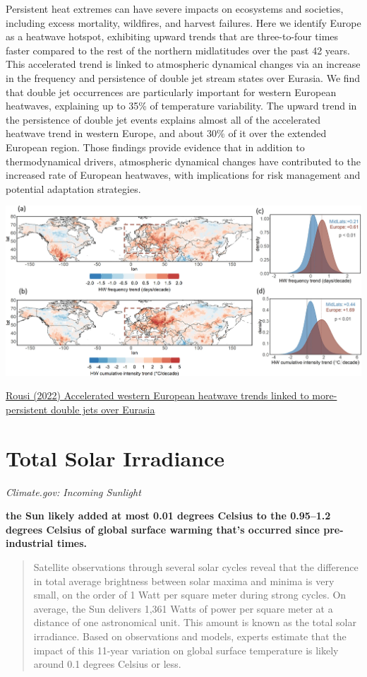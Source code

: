 \documentclass[
]{book}
\begin{document}
Persistent heat extremes can have severe impacts on ecosystems and societies, including excess mortality, wildfires, and harvest failures. Here we identify Europe as a heatwave hotspot, exhibiting upward trends that are three-to-four times faster compared to the rest of the northern midlatitudes over the past 42 years. This accelerated trend is linked to atmospheric dynamical changes via an increase in the frequency and persistence of double jet stream states over Eurasia. We find that double jet occurrences are particularly important for western European heatwaves, explaining up to 35\% of temperature variability. The upward trend in the persistence of double jet events explains almost all of the accelerated heatwave trend in western Europe, and about 30\% of it over the extended European region. Those findings provide evidence that in addition to thermodynamical drivers, atmospheric dynamical changes have contributed to the increased rate of European heatwaves, with implications for risk management and potential adaptation strategies.

\includegraphics{fig/heatwave_europe.png}

\href{https://www.nature.com/articles/s41467-022-31432-y}{Rousi (2022) Accelerated western European heatwave trends linked to more-persistent double jets over Eurasia}

\hypertarget{total-solar-irradiance}{%
\section{Total Solar Irradiance}\label{total-solar-irradiance}}

\emph{Climate.gov: Incoming Sunlight}

\textbf{the Sun likely added at most 0.01 degrees Celsius to the 0.95--1.2 degrees Celsius of global surface warming that's occurred since pre-industrial times.}

\begin{quote}
Satellite observations through several solar cycles reveal that the difference in total average brightness between solar maxima and minima is very small, on the order of 1 Watt per square meter during strong cycles. On average, the Sun delivers 1,361 Watts of power per square meter at a distance of one astronomical unit. This amount is known as the total solar irradiance. Based on observations and models, experts estimate that the impact of this 11-year variation on global surface temperature is likely around 0.1 degrees Celsius or less.
\end{quote}
\end{document}
